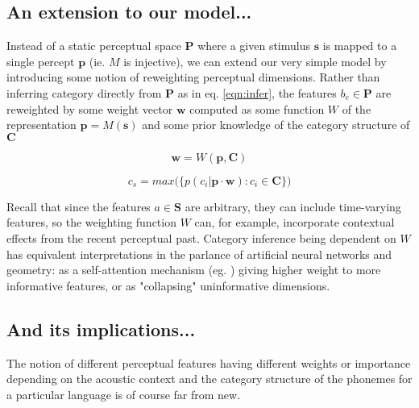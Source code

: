 \begin{multicols}{2}


\subsection{An extension to our model...}

Instead of a static perceptual space $\mathbf{P}$ where a given stimulus $\mathbf{s}$ is mapped to a single percept $\mathbf{p}$ (ie. $M$ is injective), we can extend our very simple model by introducing some notion of reweighting perceptual dimensions. Rather than inferring category directly from $\mathbf{P}$ as in eq. \ref{eqn:infer}, the features $b_e \in \mathbf{P}$ are reweighted by some weight vector $\mathbf{w}$ computed as some function $W$ of the representation $\mathbf{p} = M(\mathbf{s})$ and some prior knowledge of the category structure of $\mathbf{C}$

\begin{equation}
\label{eqn:w}
\mathbf{w} = W(\mathbf{p}, \mathbf{C})
\end{equation}

\begin{equation}
\label{eqn:infer_2}
c_s = max\big( \big\{ p(c_i | \mathbf{p} \cdot \mathbf{w}) : c_i \in \mathbf{C} \big\}\big)
\end{equation}

Recall that since the features $a \in \mathbf{S}$ are arbitrary, they can include time-varying features, so the weighting function $W$ can, for example, incorporate contextual effects from the recent perceptual past. Category inference being dependent on $W$ has equivalent interpretations in the parlance of artificial neural networks and geometry: as a self-attention mechanism (eg. \cite{vaswaniAttentionAllYou2017}) giving higher weight to more informative features, or as "collapsing" uninformative dimensions. 

\subsection{And its implications...}

The notion of different perceptual features having different weights or importance depending on the acoustic context and the category structure of the phonemes for a particular language is of course far from new. 


\end{multicols}

